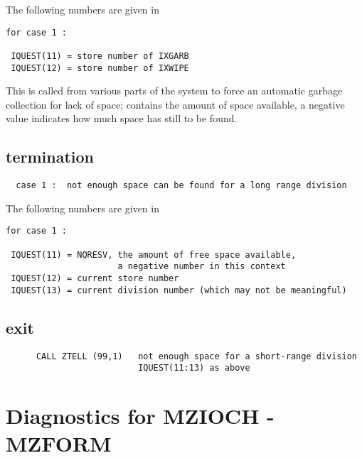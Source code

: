 The following numbers are given in 

\begin{verbatim}
for case 1 :

 IQUEST(11) = store number of IXGARB
 IQUEST(12) = store number of IXWIPE
\end{verbatim}


This is called from various parts of the system to force
an automatic garbage collection for lack of space;
 contains the amount of space available,
a negative value indicates how much space has still to be found.

\subsection*{ termination}

\begin{verbatim}
  case 1 :  not enough space can be found for a long range division
\end{verbatim}

The following numbers are given in 

\begin{verbatim}
for case 1 :

 IQUEST(11) = NQRESV, the amount of free space available,
                      a negative number in this context
 IQUEST(12) = current store number
 IQUEST(13) = current division number (which may not be meaningful)
\end{verbatim}

\subsection*{ exit}

\begin{verbatim}
      CALL ZTELL (99,1)   not enough space for a short-range division
                          IQUEST(11:13) as above
\end{verbatim}

\section{Diagnostics for MZIOCH - MZFORM}


